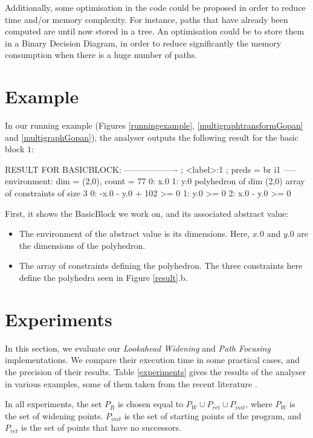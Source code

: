 \documentclass[a4paper,english,titlepage,11pt]{report}
\begin{document}
Additionally, some optimisation in the code could be proposed in order to
reduce time and/or memory complexity. For instance, paths that have already been
computed are until now stored in a tree. An optimisation could be to store them
in a Binary Decision Diagram, in order to reduce significantly the memory
consumption when there is a huge number of paths.

	\section{Example}

	In our running example (Figures \ref{runningexample},
	\ref{multigraphtransformGopan} and \ref{multigraphGopan}), the analyser
	outputs the following result for the basic block $1$:

\begin{C}
RESULT FOR BASICBLOCK: -------------------
; <label>:1                                 ; preds = %
  br i1 %
-----
environment: dim = (2,0), count = 77
 0: x.0
 1: y.0
polyhedron of dim (2,0)
array of constraints of size 3
 0: -x.0 - y.0 + 102 >= 0
 1: y.0 >= 0
 2: x.0 - y.0 >= 0
\end{C}

First, it shows the BasicBlock we work on, and its associated abstract value:
\begin{itemize}
\item The environment of the abstract value is its dimensions. Here, $x.0$ and
$y.0$ are the dimensions of the polyhedron.
\item The array of constraints defining the polyhedron. The three constraints
here define the polyhedra seen in Figure \ref{result}.b.
\end{itemize}

 \section{Experiments}

	In this section, we evaluate our \emph{Lookahead Widening} and \emph{Path
	Focusing} implementations. We compare their execution time in some
	practical cases, and the precision of their results. Table \ref{experiments}
	gives the results of the analyser in various examples, some of them taken
	from the recent literature \cite{CGGMP05,GopanR06}.

	In all experiments, the set $P_R$ is chosen equal to $P_W \cup P_{ret} \cup
	P_{init}$,
	where $P_W$ is the set of widening points. $P_{init}$ is the set of starting
	points of the program, and $P_{ret}$ is the set of points that have no
	successors.
\end{document}
